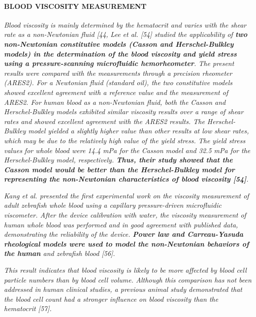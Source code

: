 \documentclass[11pt,letterpaper]{article}
\begin{document}
\paragraph{BLOOD VISCOSITY MEASUREMENT} \textit{Blood viscosity is mainly determined by the hematocrit and varies with the shear rate as a non-Newtonian fluid [44,} \newline\newline
\textit{Lee et al. [54] studied the applicability of \textbf{two non-Newtonian constitutive models ({\color{red}Casson} and {\color{red}Herschel-Bulkley models}) in the determination of the blood viscosity and yield stress using a pressure-scanning microfluidic hemorheometer}. The present results were compared with the measurements through a precision rheometer (ARES2). For a Newtonian fluid (standard oil), the two constitutive models showed excellent agreement with a reference value and the measurement of ARES2. For human blood as a non-Newtonian fluid, both the Casson and Herschel-Bulkley models exhibited similar viscosity results over a range of shear rates and showed excellent agreement with the ARES2 results. The Herschel-Bulkley model yielded a slightly higher value than other results at low shear rates, which may be due to the relatively high value of the yield stress. The yield stress values for whole blood were 14.4 mPa for the Casson model and 32.5 mPa for the Herschel-Bulkley model, respectively. {\color{blue}\textbf{Thus, their study showed that the {\color{red}Casson model} would be better than the {\color{red}Herschel-Bulkley model} for representing the non-Newtonian characteristics of blood viscosity [54]}}.}

\textit{Kang et al. presented the first experimental work on the viscosity measurement of adult zebrafish whole blood using a capillary pressure-driven microfluidic viscometer. After the device calibration with water, the viscosity measurement of human whole blood was performed and in good agreement with published data, demonstrating the reliability of the device. \textbf{{\color{red}Power law} and {\color{red}Carreau-Yasuda rheological} models were used to model the non-Newtonian behaviors of the human }and zebrafish blood [56].}


\textit{This result indicates that blood viscosity is likely to be more affected by blood cell particle numbers than by blood cell volume. Although this comparison has not been addressed in human clinical studies, a previous animal study demonstrated that the blood cell count had a stronger influence on blood viscosity than the hematocrit [57].}
\end{document}
